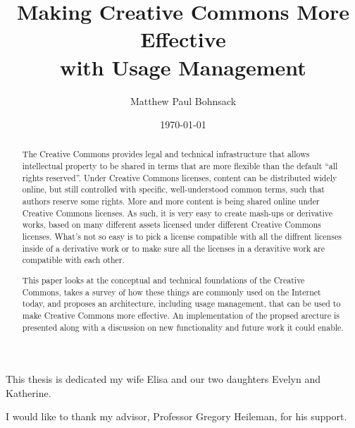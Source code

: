 \documentclass[botnum,fleqn,final]{unmeethesis}
\newcommand{\mytitle}{Making Creative Commons More Effective\\with Usage Management}
\newcommand{\myauthor}{Matthew Paul Bohnsack}
\begin{document}
\frontmatter

\title{\mytitle}
\author{\myauthor}





\date{\today}

\maketitle

\makecopyright

\begin{dedication}
   This thesis is dedicated my wife Elisa and our two daughters Evelyn and Katherine.
\end{dedication}

\begin{acknowledgments}
   \vspace{1.1in}
   I would like to thank my advisor, Professor Gregory Heileman, for his support.
\end{acknowledgments}

\maketitleabstract

\begin{abstract}
The Creative Commons provides legal and technical infrastructure that allows
intellectual property to be shared in terms that are more flexible than the
default ``all rights reserved''.  Under Creative Commons licenses, content can
be distributed widely online, but still controlled with specific,
well-understood common terms, such that authors reserve some rights.  More and
more content is being shared online under Creative Commons licenses.  As such,
it is very easy to create mash-ups or derivative works, based on many different
assets licensed under different Creative Commons licenses.  What's not so easy
is to pick a license compatible with all the diffrent licenses inside of a
derivative work or to make sure all the licenses in a deravitive work are
compatible with each other.

This paper looks at the conceptual and technical foundations of the Creative
Commons, takes a survey of how these things are commonly used on the Internet
today, and proposes an architecture, including usage management, that can be
used to make Creative Commons more effective.  An implementation of the propsed
arecture is presented along with a discussion on new functionality and future
work it could enable.
\end{abstract}
\end{document}
